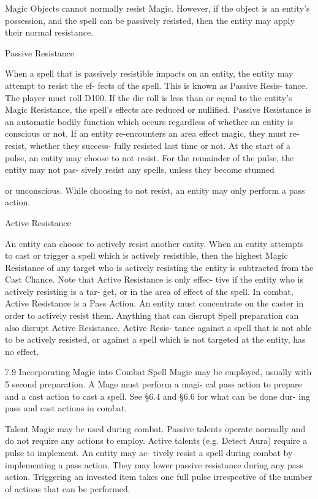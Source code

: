 \begin{Chapter}{Magic}
Objects cannot normally resist Magic. However, if 
the  object  is  an  entity’s  possession,  and  the  spell 
can be passively resisted, then the entity may apply 
their normal resistance. 

Passive Resistance 

When a spell that is passively resistible impacts on 
an  entity,  the  entity  may  attempt  to  resist  the  ef-
fects  of  the  spell.  This  is  known  as Passive  Resis-
tance. The player must roll D100. If  the die roll is 
less than or equal to the entity’s Magic Resistance, 
the spell’s effects are reduced or nullified. Passive 
Resistance  is  an  automatic  bodily  function  which 
occurs regardless of whether an entity is conscious 
or  not.  If  an  entity  re-encounters  an  area  effect 
magic,  they  must  re-resist,  whether  they  success-
fully  resisted  last  time  or  not.  At  the  start  of  a 
pulse,  an  entity  may  choose  to  not  resist.  For  the 
remainder  of  the  pulse,  the  entity  may  not  pas-
sively resist any spells, unless they become stunned 

or  unconscious.  While  choosing  to  not  resist,  an 
entity may only perform a pass action. 

Active Resistance 

An  entity  can  choose  to  actively  resist  another 
entity. When an entity attempts to cast or trigger a 
spell  which  is  actively  resistible,  then  the  highest 
Magic  Resistance  of  any  target  who  is  actively 
resisting  the  entity  is  subtracted  from  the  Cast 
Chance. Note that Active Resistance is only effec-
tive  if  the  entity  who  is  actively  resisting  is  a  tar-
get, or in the area of effect of the spell. In combat, 
Active Resistance is a Pass Action. An entity must 
concentrate on the caster in order to actively resist 
them.  Anything  that  can  disrupt  Spell  preparation 
can  also  disrupt  Active  Resistance.  Active  Resis-
tance  against a  spell  that  is  not  able  to  be  actively 
resisted, or against a spell  which is not targeted at 
the entity, has no effect. 

7.9 Incorporating Magic into Combat 
Spell  Magic  may  be  employed,  usually  with  5 
second preparation. A Mage must perform a magi-
cal pass action to prepare and a cast action to cast a 
spell. See §6.4 and §6.6 for what can be done dur-
ing pass and cast actions in combat. 

Talent Magic may be used during combat. Passive 
talents  operate  normally  and  do  not  require  any 
actions to employ. Active talents (e.g. Detect Aura) 
require  a  pulse  to  implement.  An  entity  may  ac-
tively resist a spell during combat by implementing 
a  pass  action.  They  may  lower  passive  resistance 
during any pass action. Triggering an invested item 
takes  one  full  pulse  irrespective  of  the  number  of 
actions that can be performed. 


\end{Chapter}
